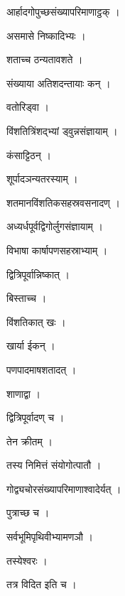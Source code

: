 \documentclass[10pt, openany]{book}
\begin{document}
\noindent आर्हादगोपुच्छसंख्यापरिमाणाट्ठक् ।

\noindent असमासे निष्कादिभ्यः ।

\noindent शताच्च ठन्यतावशते ।

\noindent संख्याया अतिशदन्तायाः कन् ।

\noindent वतोरिड्वा ।

\noindent विंशतित्रिंशद्भ्यां ड्वुन्नसंज्ञायाम् ।

\noindent कंसाट्टिठन् ।

\noindent शूर्पादञन्यतरस्याम् ।

\noindent शतमानविंशतिकसहस्रवसनादण् ।

\noindent अध्यर्धपूर्वद्विगोर्लुगसंज्ञायाम् ।

\noindent विभाषा कार्षापणसहस्राभ्याम् ।

\noindent द्वित्रिपूर्वान्निष्कात् ।

\noindent बिस्ताच्च ।

\noindent विंशतिकात् खः ।

\noindent खार्या ईकन् ।

\noindent पणपादमाषशतादत् ।

\noindent शाणाद्वा ।

\noindent द्वित्रिपूर्वादण् च ।

\noindent तेन क्रीतम् ।

\noindent तस्य निमित्तं संयोगोत्पातौ ।

\noindent गोद्व्यचोरसंख्यापरिमाणाश्वादेर्यत् ।

\noindent पुत्राच्छ च ।

\noindent सर्वभूमिपृथिवीभ्यामणञौ ।

\noindent तस्येश्वरः ।

\noindent तत्र विदित इति च ।
\end{document}
